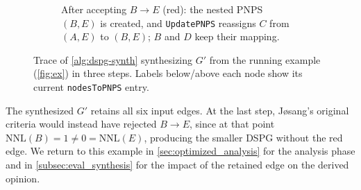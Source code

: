 \begin{figure}
\begin{subfigure}{0.32\textwidth}
    \caption{After accepting $B\to E$ (red): the nested \ac{PNPS} $(B,E)$ is created, and \texttt{UpdatePNPS} reassigns $C$ from $(A,E)$ to $(B,E)$; $B$ and $D$ keep their mapping.}
    \label{fig:synth-step3}
    \end{subfigure}
    \caption{Trace of \cref{alg:dspg-synth} synthesizing $G'$ from the running example (\cref{fig:ex}) in three steps. Labels below/above each node show its current \texttt{nodesToPNPS} entry.}
    \label{fig:synth-trace}
\end{figure}

The synthesized $G'$ retains all six input edges. At the last step, J{\o}sang's original criteria would instead have rejected $B \to E$, since at that point $\mathrm{NNL}(B)=1 \neq 0 = \mathrm{NNL}(E)$, producing the smaller \ac{DSPG} without the red edge. We return to this example in \cref{sec:optimized_analysis} for the analysis phase and in \cref{subsec:eval_synthesis} for the impact of the retained edge on the derived opinion.

